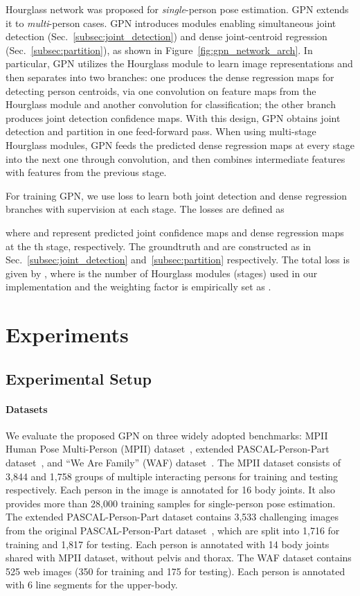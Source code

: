 \documentclass[10pt,twocolumn,letterpaper]{article}
\begin{document}
Hourglass network was  proposed for \emph{single}-person pose estimation. GPN extends it to \emph{multi}-person cases.  GPN introduces modules enabling simultaneous joint detection (Sec.~\ref{subsec:joint_detection})  and dense joint-centroid regression (Sec.~\ref{subsec:partition}), as shown in Figure~\ref{fig:gpn_network_arch}. In particular, GPN utilizes the Hourglass module to learn image  representations and then separates into two branches: one  produces the dense regression maps for detecting person centroids,   via one  convolution on feature maps from the Hourglass module and another   convolution for classification; the other branch produces  joint detection confidence maps. With this design, GPN obtains joint detection and partition in one feed-forward pass. When using multi-stage Hourglass modules, GPN feeds the predicted dense regression maps  at every stage into the next one through  convolution, and then combines  intermediate features with  features from the previous stage.

For training GPN, we use  loss to learn both joint detection and dense regression branches with supervision at each stage. The losses are defined as

where  and  represent predicted joint confidence maps and dense regression maps at the th stage, respectively.
The groundtruth  and  are constructed as  in  Sec.~\ref{subsec:joint_detection} and~\ref{subsec:partition} respectively.
The total loss is given by
,
where  is the number of  Hourglass modules (stages) used in our implementation  and  the weighting factor   is empirically set as .

\section{Experiments}


\subsection{Experimental Setup}

\paragraph{Datasets} We evaluate the proposed GPN  on three widely adopted benchmarks: MPII Human Pose Multi-Person (MPII) dataset~\cite{andriluka14cvpr}, extended PASCAL-Person-Part dataset~\cite{xia2017joint}, and ``We Are Family'' (WAF) dataset~\cite{eichner2010we}. The MPII dataset consists of 3,844  and 1,758  groups of multiple interacting persons for training and testing respectively. Each person in the image is annotated for 16 body joints. It also provides  more than 28,000 training samples for single-person pose estimation. The extended PASCAL-Person-Part dataset contains 3,533 challenging images from the original PASCAL-Person-Part dataset~\cite{chen2014detect}, which are split into 1,716  for training and 1,817  for testing. Each person is annotated with 14 body joints shared with MPII dataset, without pelvis and thorax.  The WAF dataset contains 525 web images (350   for training and 175  for testing). Each person  is annotated with 6 line segments for the upper-body.
\end{document}
